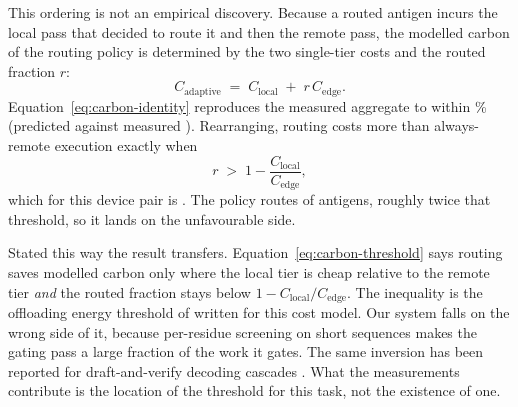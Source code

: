 This ordering is not an empirical discovery. Because a routed antigen incurs
the local pass that
decided to route it and then the remote pass, the modelled carbon of the
routing policy is determined by the two single-tier costs and the
routed fraction $r$:
\begin{equation}
C_{\text{adaptive}} \;=\; C_{\text{local}} \;+\; r\,C_{\text{edge}}.
\label{eq:carbon-identity}
\end{equation}
Equation~\ref{eq:carbon-identity} reproduces the measured aggregate to within
\CarbonIdentityError{}\% (predicted \CarbonPredictedAdaptive{} against measured
\AdaptiveSplitCarbon{}). Rearranging, routing costs more than always-remote
execution exactly when
\begin{equation}
r \;>\; 1 - \frac{C_{\text{local}}}{C_{\text{edge}}},
\label{eq:carbon-threshold}
\end{equation}
which for this device pair is \CarbonBreakEvenRate{}. The policy routes
\AdaptiveSplitRouteRate{} of antigens, roughly twice that threshold, so it
lands on the unfavourable side.

Stated this way the result transfers. Equation~\ref{eq:carbon-threshold} says
routing saves modelled carbon only where the local tier is cheap relative to
the remote tier \emph{and} the routed fraction stays below
$1 - C_{\text{local}}/C_{\text{edge}}$. The inequality is the offloading energy
threshold of \citet{kumar2010cloud} written for this cost model. Our system falls on the
wrong side of it, because per-residue screening on short
sequences makes the gating pass a large fraction of the work it gates. The
same inversion has been reported for draft-and-verify decoding cascades
\citep{dutta2026speculative}. What the measurements contribute is the location
of the threshold for this task, not the existence of one.

